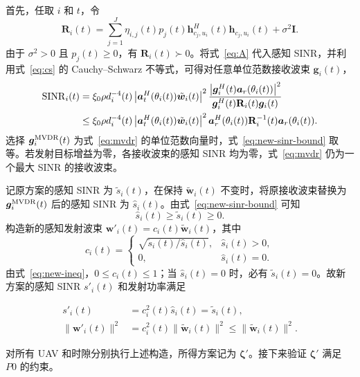 \documentclass[11pt,a4paper]{ctexart}
\begin{document}
首先，任取 $i$ 和 $t$，令
\begin{equation}\label{eq:new-cov}
\mathbf R_i(t)=\sum_{j=1}^{J}\eta_{i,j}(t)p_j(t)
\bm h_{c_j,u_i}^{H}(t)\bm h_{c_j,u_i}(t)+\sigma^2\mathbf I.
\end{equation}
由于 $\sigma^2>0$ 且 $p_j(t)\ge0$，有 $\mathbf R_i(t)\succ0$。将式~\eqref{eq:A} 代入感知 SINR，并利用式~\eqref{eq:cs} 的 Cauchy--Schwarz 不等式，可得对任意单位范数接收波束 $\bm g_i(t)$，
\begin{align}\label{eq:new-sinr-bound}
\operatorname{SINR}_i(t)
&=\xi_0\rho d_i^{-4}(t)\left|\bm a_t^H(\theta_i(t))\tilde{\bm w}_i(t)\right|^2
\frac{\left|\bm g_i^H(t)\bm a_r(\theta_i(t))\right|^2}
{\bm g_i^H(t)\mathbf R_i(t)\bm g_i(t)}\notag\\
&\le\xi_0\rho d_i^{-4}(t)\left|\bm a_t^H(\theta_i(t))\tilde{\bm w}_i(t)\right|^2
\bm a_r^H(\theta_i(t))\mathbf R_i^{-1}(t)\bm a_r(\theta_i(t)).
\end{align}
选择 $\bm g_i^{\rm MVDR}(t)$ 为式~\eqref{eq:mvdr} 的单位范数向量时，式~\eqref{eq:new-sinr-bound} 取等。若发射目标增益为零，各接收波束的感知 SINR 均为零，式~\eqref{eq:mvdr} 仍为一个最大 SINR 的接收波束。

记原方案的感知 SINR 为 $\tilde s_i(t)$，在保持 $\tilde{\bm w}_i(t)$ 不变时，将原接收波束替换为 $\bm g_i^{\rm MVDR}(t)$ 后的感知 SINR 为 $\hat s_i(t)$。由式~\eqref{eq:new-sinr-bound} 可知
\begin{equation}\label{eq:new-ineq}
\hat s_i(t)\ge\tilde s_i(t)\ge0.
\end{equation}
构造新的感知发射波束 $\bm w'_i(t)=c_i(t)\tilde{\bm w}_i(t)$，其中
\begin{equation}\label{eq:new-scale}
c_i(t)=
\begin{cases}
\sqrt{\tilde s_i(t)/\hat s_i(t)},&\hat s_i(t)>0,\\
0,&\hat s_i(t)=0.
\end{cases}
\end{equation}
由式~\eqref{eq:new-ineq}，$0\le c_i(t)\le1$；当 $\hat s_i(t)=0$ 时，必有 $\tilde s_i(t)=0$。故新方案的感知 SINR $s'_i(t)$ 和发射功率满足
\begin{samepage}
\begin{align}\label{eq:new-same-sinr}
s'_i(t)&=c_i^2(t)\hat s_i(t)=\tilde s_i(t),\\
\|\bm w'_i(t)\|^2&=c_i^2(t)\|\tilde{\bm w}_i(t)\|^2\le\|\tilde{\bm w}_i(t)\|^2.\label{eq:new-power}
\end{align}
\end{samepage}
对所有 UAV 和时隙分别执行上述构造，所得方案记为 $\bm\zeta'$。接下来验证 $\bm\zeta'$ 满足 $P0$ 的约束。
\end{document}
